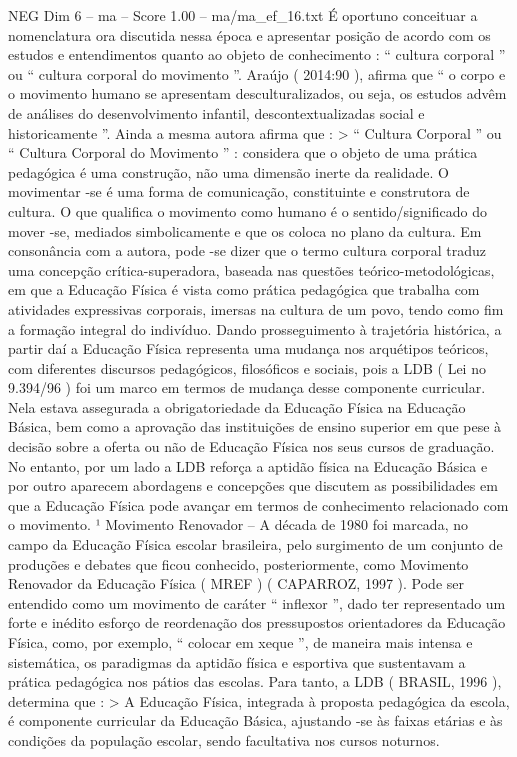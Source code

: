 \begin{textsample}{NEG Dim 6 – ma – Score 1.00 – ma/ma\_ef\_16.txt}
É oportuno conceituar a nomenclatura ora discutida nessa época e apresentar posição de acordo com os estudos e entendimentos quanto ao objeto de conhecimento : “ cultura corporal ” ou “ cultura corporal do movimento ”.
Araújo ( 2014:90 ), afirma que “ o corpo e o movimento humano se apresentam desculturalizados, ou seja, os estudos advêm de análises do desenvolvimento infantil, descontextualizadas social e historicamente ”.
Ainda a mesma autora afirma que : > “ Cultura Corporal ” ou “ Cultura Corporal do Movimento ” : considera que o objeto de uma prática pedagógica é uma construção, não uma dimensão inerte da realidade.
O movimentar -se é uma forma de comunicação, constituinte e construtora de cultura.
O que qualifica o movimento como humano é o sentido/significado do mover -se, mediados simbolicamente e que os coloca no plano da cultura.
Em consonância com a autora, pode -se dizer que o termo cultura corporal traduz uma concepção crítica-superadora, baseada nas questões teórico-metodológicas, em que a Educação Física é vista como prática pedagógica que trabalha com atividades expressivas corporais, imersas na cultura de um povo, tendo como fim a formação integral do indivíduo.
Dando prosseguimento à trajetória histórica, a partir daí a Educação Física representa uma mudança nos arquétipos teóricos, com diferentes discursos pedagógicos, filosóficos e sociais, pois a LDB ( Lei no 9.394/96 ) foi um marco em termos de mudança desse componente curricular.
Nela estava assegurada a obrigatoriedade da Educação Física na Educação Básica, bem como a aprovação das instituições de ensino superior em que pese à decisão sobre a oferta ou não de Educação Física nos seus cursos de graduação.
No entanto, por um lado a LDB reforça a aptidão física na Educação Básica e por outro aparecem abordagens e concepções que discutem as possibilidades em que a Educação Física pode avançar em termos de conhecimento relacionado com o movimento. ¹ Movimento Renovador – A década de 1980 foi marcada, no campo da Educação Física escolar brasileira, pelo surgimento de um conjunto de produções e debates que ficou conhecido, posteriormente, como Movimento Renovador da Educação Física ( MREF ) ( CAPARROZ, 1997 ).
Pode ser entendido como um movimento de caráter “ inflexor ”, dado ter representado um forte e inédito esforço de reordenação dos pressupostos orientadores da Educação Física, como, por exemplo, “ colocar em xeque ”, de maneira mais intensa e sistemática, os paradigmas da aptidão física e esportiva que sustentavam a prática pedagógica nos pátios das escolas.
Para tanto, a LDB ( BRASIL, 1996 ), determina que : > A Educação Física, integrada à proposta pedagógica da escola, é componente curricular da Educação Básica, ajustando -se às faixas etárias e às condições da população escolar, sendo facultativa nos cursos noturnos.

\end{textsample}
